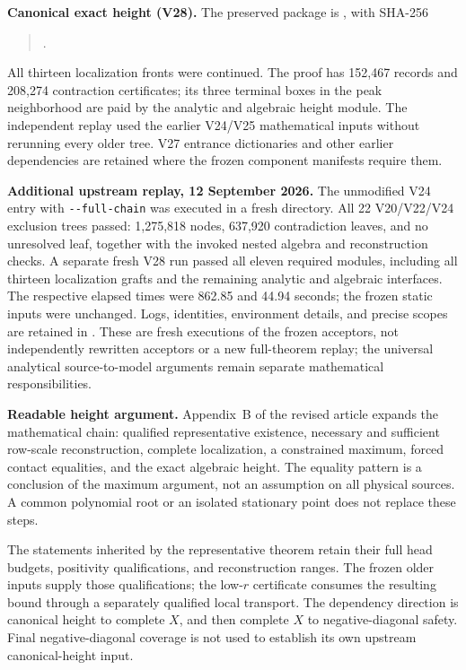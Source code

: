 \documentclass[10pt]{article}
\begin{document}
\textbf{Canonical exact height (V28).}
The preserved package is
,
with SHA-256
\begin{quote}
.
\end{quote}
All thirteen localization fronts were continued. The proof has
152,467 records and 208,274 contraction certificates; its three
terminal boxes in the peak neighborhood are paid by the analytic and
algebraic height module. The independent replay used the earlier
V24/V25 mathematical inputs without rerunning every older tree.
V27 entrance dictionaries and other earlier dependencies are retained
where the frozen component manifests require them.

\textbf{Additional upstream replay, 12 September 2026.}
The unmodified V24 entry with \verb|--full-chain| was executed in
a fresh directory. All 22 V20/V22/V24 exclusion trees passed:
1,275,818 nodes, 637,920 contradiction leaves, and no unresolved
leaf, together with the invoked nested algebra and reconstruction
checks. A separate fresh V28 run passed all eleven required modules,
including all thirteen localization grafts and the remaining analytic
and algebraic interfaces. The respective elapsed times were
862.85 and 44.94 seconds; the frozen static inputs were unchanged.
Logs, identities, environment details, and precise scopes are retained
in . These are fresh executions of the
frozen acceptors, not independently rewritten acceptors or a new
full-theorem replay; the universal analytical source-to-model
arguments remain separate mathematical responsibilities.

\textbf{Readable height argument.}
Appendix~B of the revised article expands the mathematical chain:
qualified representative existence, necessary and sufficient row-scale
reconstruction, complete localization, a constrained maximum, forced
contact equalities, and the exact algebraic height. The equality pattern
is a conclusion of the maximum argument, not an assumption on all
physical sources. A common polynomial root or an isolated stationary
point does not replace these steps.

The statements inherited by the representative theorem retain their
full head budgets, positivity qualifications, and reconstruction ranges.
The frozen older inputs supply those qualifications; the low-\(r\)
certificate consumes the resulting bound through a separately qualified
local transport. The dependency direction is canonical height to complete
\(X\), and then complete \(X\) to negative-diagonal safety. Final
negative-diagonal coverage is not used to establish its own upstream
canonical-height input.
\end{document}
